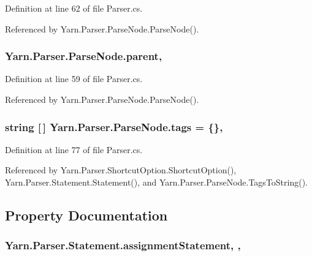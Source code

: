 Definition at line 62 of file Parser.\-cs.



Referenced by Yarn.\-Parser.\-Parse\-Node.\-Parse\-Node().

\hypertarget{a00150_af313a82103fcc2ff5a177dbb06b92f7b}{
\subsubsection[{parent}]{ Yarn.\-Parser.\-Parse\-Node.\-parent\hspace{0.3cm}{\ttfamily [package]}, {\ttfamily [inherited]}}}\label{a00150_af313a82103fcc2ff5a177dbb06b92f7b}


Definition at line 59 of file Parser.\-cs.



Referenced by Yarn.\-Parser.\-Parse\-Node.\-Parse\-Node().

\hypertarget{a00150_a58b3a15788fd2d4127d73619dc6d04ae}{
\subsubsection[{tags}]{\setlength{\rightskip}{0pt plus 5cm}string \mbox{[}$\,$\mbox{]} Yarn.\-Parser.\-Parse\-Node.\-tags = \{\}\hspace{0.3cm}{\ttfamily [package]}, {\ttfamily [inherited]}}}\label{a00150_a58b3a15788fd2d4127d73619dc6d04ae}


Definition at line 77 of file Parser.\-cs.



Referenced by Yarn.\-Parser.\-Shortcut\-Option.\-Shortcut\-Option(), Yarn.\-Parser.\-Statement.\-Statement(), and Yarn.\-Parser.\-Parse\-Node.\-Tags\-To\-String().



\subsection{Property Documentation}
\hypertarget{a00168_a7fa97a80f1b9313bc2bd4194e3f75759}{
\subsubsection[{assignment\-Statement}]{ Yarn.\-Parser.\-Statement.\-assignment\-Statement\hspace{0.3cm}{\ttfamily [get]}, {\ttfamily [set]}, {\ttfamily [package]}}}\label{a00168_a7fa97a80f1b9313bc2bd4194e3f75759}



